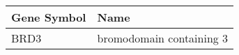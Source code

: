 \begin{tabular}{ll}
\toprule
Gene Symbol &                     Name \\
\midrule
       BRD3 & bromodomain containing 3 \\
\bottomrule
\end{tabular}
